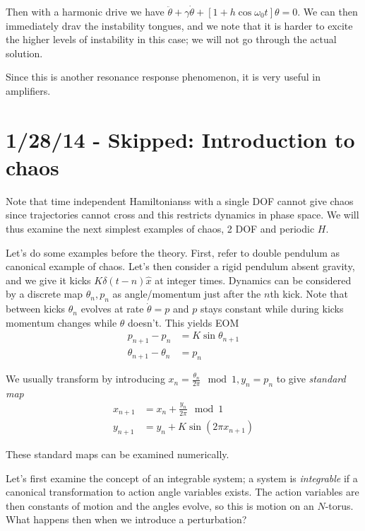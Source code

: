 \documentclass[10pt]{report}
\begin{document}
Then with a harmonic drive we have $\ddot{\theta} + \gamma\dot{\theta} + \left[ 1 + h\cos \omega_0 t \right]\theta = 0$. We can then immediately drav the instability tongues, and we note that it is harder to excite the higher levels of instability in this case; we will not go through the actual solution. 

Since this is another resonance response phenomenon, it is very useful in amplifiers. 

\chapter{1/28/14 - Skipped: Introduction to chaos}

Note that time independent Hamiltonianss with a single DOF cannot give chaos since trajectories cannot cross and this restricts dynamics in phase space. We will thus examine the next simplest examples of chaos, 2 DOF and periodic $H$.

Let's do some examples before the theory. First, refer to double pendulum as canonical example of chaos. Let's then consider a rigid pendulum absent gravity, and we give it kicks $K\delta(t-n)\hat{x}$ at integer times. Dynamics can be considered by a discrete map $\theta_n, p_n$ as angle/momentum just after the $n$th kick. Note that between kicks $\theta_n$ evolves at rate $\dot{\theta} = p$ and $p$ stays constant while during kicks momentum changes while $\theta$ doesn't. This yields EOM
\begin{align}
    p_{n+1} - p_n &= K\sin\theta_{n+1}\\
    \theta_{n+1}-\theta_n &= p_n
    \label{1.28.EOM}
\end{align}

We usually transform by introducing $x_n = \frac{\theta_n}{2\pi} \mod 1, y_n = p_n$ to give \emph{standard map}
\begin{align}
    x_{n+1} &= x_n + \frac{y_n}{2\pi}\mod 1\\
    y_{n+1} &= y_n + K\sin\left( 2\pi x_{n+1} \right)
    \label{1.28.stdmap}
\end{align}

These standard maps can be examined numerically.

Let's first examine the concept of an integrable system; a system is \emph{integrable} if a canonical transformation to action angle variables exists. The action variables are then constants of motion and the angles evolve, so this is motion on an $N$-torus. What happens then when we introduce a perturbation?
\end{document}
